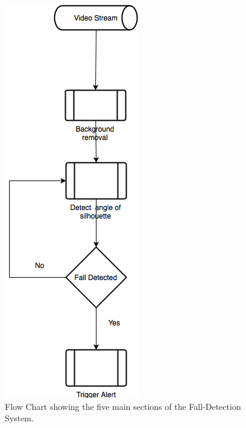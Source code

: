 \documentclass[11pt,a4paper]{report}
\begin{document}
\begin{figure}[H]
 \centering
 \includegraphics[scale = 0.4]{basicFlowChart.png}
 \caption[Flow Chart]{Flow Chart showing the five main sections of the Fall-Detection System.}
 \label{fig:basicFlowChart}
\end{figure}
\end{document}
